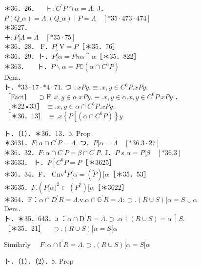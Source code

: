 \documentclass[10pt]{article}
\begin{document}
＊36．26．$\quad \vdash: C^{\prime} P \cap \alpha=\Lambda$. J．$P\left(Q \_\alpha\right)=\dot{\Lambda} .\left(Q \_\alpha\right) \mid P=\dot{\Lambda} \quad[* 35 \cdot 473 \cdot 474]$\\
＊3627．\\
＋$: P[\Lambda=\dot{\Lambda} \quad[* 35 \cdot 75]$\\
＊36．28． F．$P[\mathrm{~V}=P$［＊35．76］\\
＊36．29．ト．$P[\alpha=P \dot{n} \alpha \uparrow \alpha$［＊35．822］\\
＊363．$\quad$ ト．$P \backslash \alpha=P \complement\left(\alpha \cap C^{6} P\right)$\\
Dem．\\
ト．$* 33 \cdot 17 \cdot * 4 \cdot 71$. つ $: x P y . \equiv . x, y \in C^{6} P . x P y:$\\
［Fact］$\quad \supset \mathrm{F}: x, y \in \alpha . x P y . \equiv . x, y \in \alpha . x, y \in C^{6} P . x P y$ ．\\
［＊22•33］ $\equiv . x, y \in \alpha \cap C^{6} P . x P y$.\\
［＊36．13］ $\equiv . x\left\{P\left[\left(\alpha \cap C^{6} P\right)\right\} y\right.$

ト．（1）．＊36．13．ɔ. Prop\\
＊3631．$F: \alpha \cap C^{\prime} P=\Lambda$. つ．$P[\alpha=\dot{\Lambda} \quad[* 36.3 \cdot 27]$\\
＊36．32．$F: \alpha \cap C^{\prime} P=\beta \cap C^{\prime} P$. J．$P$ s $\alpha=P[\beta \quad[* 36.3]$\\
＊3633． ト．$P\left[C^{6} P=P\right.$［＊3625］\\
＊36．34．F． $\mathrm{Cnv}^{4} P[\alpha=(\breve{P})[\alpha$［＊35．53］\\
＊3635．$F .\left(P[\alpha)^{2} \subset\left(P^{2}\right)[\alpha\right.$［＊3622］\\
＊364．F：$\alpha \cap D^{\prime} R=\Lambda . \mathrm{v} . \alpha \cap \mathbb{G}^{\prime} R=\Lambda: \supset .(R \cup S)[\alpha=S$ ↓ $\alpha$\\
Dem．\\
ト．＊35．643．ɔ ：$\alpha \cap \mathrm{D}^{\prime} R=\Lambda . \supset . \alpha \dagger(R \cup S)=\alpha \upharpoonleft S$.\\
［＊35．21］$\quad \supset .(R \cup S)[\alpha=S[\alpha$

Similarly $\quad F: \alpha \cap \mathbb{I}^{\prime} R=\Lambda . \supset .(R \cup S)[\alpha=S[\alpha$

ト．（1）．（2）．ɔ. Prop
\end{document}

